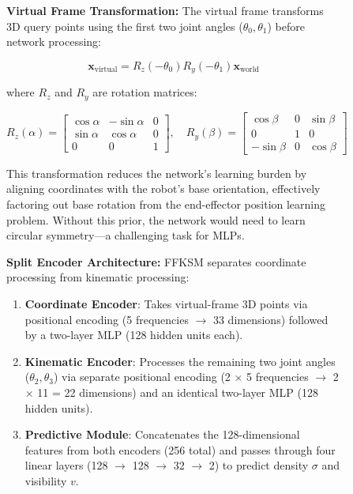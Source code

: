 \documentclass[12pt,a4paper,oneside]{report}
\begin{document}
\begin{figure}[H]
\textbf{Virtual Frame Transformation:} The virtual frame transforms 3D query points using the first two joint angles ($\theta_0, \theta_1$) before network processing:

\begin{equation}
\mathbf{x}_{\text{virtual}} = R_z(-\theta_0) R_y(-\theta_1) \mathbf{x}_{\text{world}}
\end{equation}

where $R_z$ and $R_y$ are rotation matrices:

\begin{equation}
R_z(\alpha) = \begin{bmatrix}
\cos\alpha & -\sin\alpha & 0 \\
\sin\alpha & \cos\alpha & 0 \\
0 & 0 & 1
\end{bmatrix}, \quad
R_y(\beta) = \begin{bmatrix}
\cos\beta & 0 & \sin\beta \\
0 & 1 & 0 \\
-\sin\beta & 0 & \cos\beta
\end{bmatrix}
\end{equation}

This transformation reduces the network's learning burden by aligning coordinates with the robot's base orientation, effectively factoring out base rotation from the end-effector position learning problem. Without this prior, the network would need to learn circular symmetry---a challenging task for MLPs.

\textbf{Split Encoder Architecture:} FFKSM separates coordinate processing from kinematic processing:

\begin{enumerate}
    \item \textbf{Coordinate Encoder}: Takes virtual-frame 3D points via positional encoding (5 frequencies $\rightarrow$ 33 dimensions) followed by a two-layer MLP (128 hidden units each).
    \item \textbf{Kinematic Encoder}: Processes the remaining two joint angles ($\theta_2, \theta_3$) via separate positional encoding (2 $\times$ 5 frequencies $\rightarrow$ 2 $\times$ 11 = 22 dimensions) and an identical two-layer MLP (128 hidden units).
    \item \textbf{Predictive Module}: Concatenates the 128-dimensional features from both encoders (256 total) and passes through four linear layers (128 $\rightarrow$ 128 $\rightarrow$ 32 $\rightarrow$ 2) to predict density $\sigma$ and visibility $v$.
\end{enumerate}


\end{figure}
\end{document}
